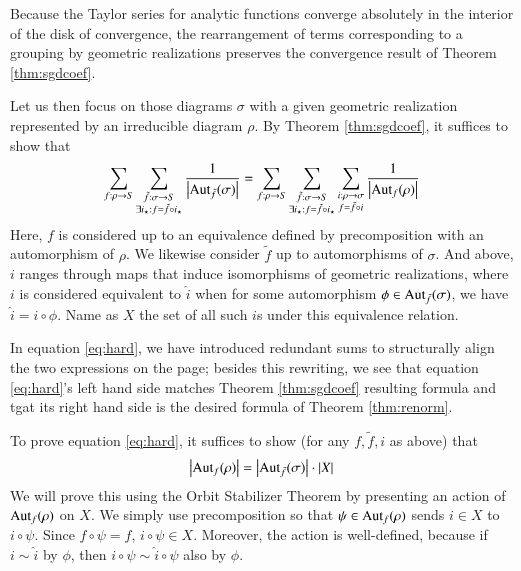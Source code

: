 \documentclass{article}
\theoremstyle{plain}
\theoremstyle{definition}
\newcommand{\wabs}[1]{\left|#1\right|}
\newcommand{\Aut}{\text{\textnormal{Aut}}}
\begin{document}
            Because the Taylor series for analytic functions converge
            absolutely in the interior of the disk of convergence, the
            rearrangement of terms corresponding to a grouping by geometric
            realizations preserves the convergence result of Theorem
            \ref{thm:sgdcoef}.  

            Let us then focus on those diagrams $\sigma$ with a given geometric
            realization represented by an irreducible diagram $\rho$.  By
            Theorem \ref{thm:sgdcoef}, it suffices to show that
            \begin{equation} \label{eq:hard}
                \sum_{f:\rho\to S}
                \sum_{\substack{
                    \tilde f:\sigma\to S \\
                    \exists i_\star: f=\tilde f \circ i_\star
                }}
                \frac{1}{\wabs{\Aut_{\tilde f}(\sigma)}}
                =
                \sum_{f:\rho\to S}
                \sum_{\substack{
                    \tilde f:\sigma\to S \\
                    \exists i_\star: f=\tilde f \circ i_\star
                }}
                \sum_{\substack{
                    i:\rho\to\sigma \\
                    f = \tilde f \circ i
                }}
                \frac{1}{\wabs{\Aut_{f}(\rho)}}
            \end{equation}
            Here, $f$ is considered up to an equivalence defined by
            precomposition with an automorphism of $\rho$.  We likewise
            consider $\tilde f$ up to automorphisms of $\sigma$.  And above,
            $i$ ranges through maps that induce isomorphisms of geometric
            realizations, where $i$ is considered equivalent to $\hat i$ when
            for some automorphism $\phi \in \Aut_{\tilde f}(\sigma)$, we have
            $\hat i = i \circ \phi$.  Name as $X$ the set of all such $i$s
            under this equivalence relation.

            In equation \ref{eq:hard}, we have introduced
            redundant sums to structurally align the two expressions on the
            page; besides this rewriting, we see that equation \ref{eq:hard}'s
            left hand side matches Theorem \ref{thm:sgdcoef} resulting formula
            and tgat its right hand side is the desired formula of Theorem
            \ref{thm:renorm}. 

            To prove equation \ref{eq:hard}, it suffices to show (for any
            $f, \tilde f, i$ as above) that
            $$
                \wabs{\Aut_f(\rho)}
                =
                \wabs{\Aut_{\tilde f}(\sigma)}
                \cdot
                \wabs{X}
            $$
            We will prove this using the Orbit Stabilizer Theorem by presenting
            an action of $\Aut_f(\rho)$ on $X$.  We simply use precomposition
            so that $\psi\in \Aut_f(\rho)$ sends $i\in X$ to $i\circ \psi$.
            Since $f\circ\psi = f$, $i\circ \psi \in X$.  Moreover, the action
            is well-defined, because if $i\sim \hat i$ by $\phi$, then $i \circ
            \psi \sim \hat i \circ \psi$ also by $\phi$.
            
\end{document}
